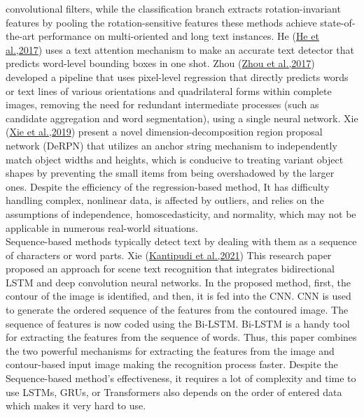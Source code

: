 convolutional filters, while the classification branch extracts rotation-invariant features by pooling the rotation-sensitive features these methods achieve state-of-the-art performance on multi-oriented and long text instances. He (\hyperref[He2017]{He et al.,2017}) uses a text attention mechanism to make an accurate text detector that predicts word-level bounding boxes in one shot. Zhou (\hyperref[Zhou2017]{Zhou et al.,2017}) developed a pipeline that uses pixel-level regression that directly predicts words or text lines of various orientations and quadrilateral forms within complete images, removing the need for redundant intermediate processes (such as candidate aggregation and word segmentation), using a single neural network. Xie (\hyperref[Xie2019]{Xie et al.,2019}) present a novel dimension-decomposition region proposal network (DeRPN) that utilizes an anchor string mechanism to independently match object
widths and heights, which is conducive to treating variant object shapes by preventing the small items from being overshadowed by the larger ones. Despite the efficiency of the regression-based method, It has difficulty handling complex, nonlinear data, is affected by outliers, and relies on the assumptions of independence, homoscedasticity, and normality, which may not be applicable in numerous real-world situations.\\
Sequence-based methods typically detect text by dealing with them as a sequence of characters or word parts. Xie (\hyperref[Kantipudi2021]{Kantipudi et al.,2021}) This research paper proposed an approach for scene text recognition that integrates bidirectional LSTM and deep convolution neural networks. In the proposed method, first, the contour of the image is identified, and then, it is fed into the CNN. CNN is used to generate the ordered sequence of the features from the contoured image. The sequence of features is now coded using the Bi-LSTM. Bi-LSTM is a handy tool for extracting the features from the sequence of words. Thus, this paper combines the two powerful mechanisms for extracting the features from the image and contour-based input image making the recognition process faster. Despite the Sequence-based method's effectiveness, it requires a lot of complexity and time to use LSTMs, GRUs, or Transformers also depends on the order of entered data which makes it very hard to use.
\\
